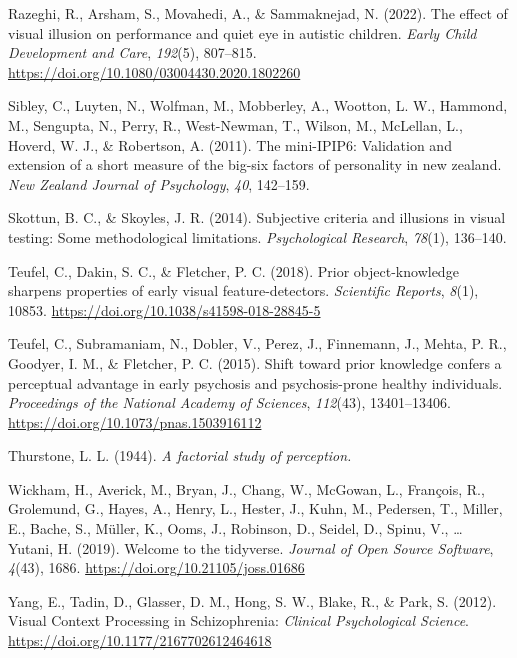 \documentclass[
  man,floatsintext]{apa6}
\newlength{\cslhangindent}
\newlength{\cslentryspacingunit} %
\newenvironment{CSLReferences}[2] %
 {%
  \setlength{\parindent}{0pt}
  \ifodd #1
  \let\oldpar\par
  \def\par{\hangindent=\cslhangindent\oldpar}
  \fi
  \setlength{\parskip}{#2\cslentryspacingunit}
 }%
 {}
\begin{document}
\begin{CSLReferences}{1}{0}
\leavevmode{}%
Razeghi, R., Arsham, S., Movahedi, A., \& Sammaknejad, N. (2022). The effect of visual illusion on performance and quiet eye in autistic children. \emph{Early Child Development and Care}, \emph{192}(5), 807--815. \url{https://doi.org/10.1080/03004430.2020.1802260}

\leavevmode{}%
Sibley, C., Luyten, N., Wolfman, M., Mobberley, A., Wootton, L. W., Hammond, M., Sengupta, N., Perry, R., West-Newman, T., Wilson, M., McLellan, L., Hoverd, W. J., \& Robertson, A. (2011). The mini-IPIP6: Validation and extension of a short measure of the big-six factors of personality in new zealand. \emph{New Zealand Journal of Psychology}, \emph{40}, 142--159.

\leavevmode{}%
Skottun, B. C., \& Skoyles, J. R. (2014). Subjective criteria and illusions in visual testing: Some methodological limitations. \emph{Psychological Research}, \emph{78}(1), 136--140.

\leavevmode{}%
Teufel, C., Dakin, S. C., \& Fletcher, P. C. (2018). Prior object-knowledge sharpens properties of early visual feature-detectors. \emph{Scientific Reports}, \emph{8}(1), 10853. \url{https://doi.org/10.1038/s41598-018-28845-5}

\leavevmode{}%
Teufel, C., Subramaniam, N., Dobler, V., Perez, J., Finnemann, J., Mehta, P. R., Goodyer, I. M., \& Fletcher, P. C. (2015). Shift toward prior knowledge confers a perceptual advantage in early psychosis and psychosis-prone healthy individuals. \emph{Proceedings of the National Academy of Sciences}, \emph{112}(43), 13401--13406. \url{https://doi.org/10.1073/pnas.1503916112}

\leavevmode{}%
Thurstone, L. L. (1944). \emph{A factorial study of perception.}

\leavevmode{}%
Wickham, H., Averick, M., Bryan, J., Chang, W., McGowan, L., François, R., Grolemund, G., Hayes, A., Henry, L., Hester, J., Kuhn, M., Pedersen, T., Miller, E., Bache, S., Müller, K., Ooms, J., Robinson, D., Seidel, D., Spinu, V., \ldots{} Yutani, H. (2019). Welcome to the tidyverse. \emph{Journal of Open Source Software}, \emph{4}(43), 1686. \url{https://doi.org/10.21105/joss.01686}

\leavevmode{}%
Yang, E., Tadin, D., Glasser, D. M., Hong, S. W., Blake, R., \& Park, S. (2012). Visual Context Processing in Schizophrenia: \emph{Clinical Psychological Science}. \url{https://doi.org/10.1177/2167702612464618}


\end{CSLReferences}
\end{document}
